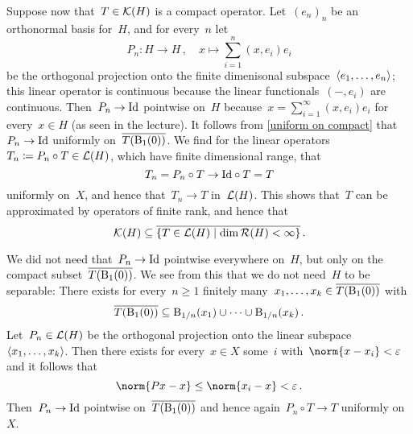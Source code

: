 Suppose now that~$T \in \mathcal{K}(H)$ is a compact operator.
Let~$(e_n)_n$ be an orthonormal basis for~$H$, and for every~$n$ let
\[
  P_n
  \colon
  H
  \to
  H \,,
  \quad
  x
  \mapsto
  \sum_{i=1}^n (x,e_i) e_i
\]
be the orthogonal projection onto the finite dimenisonal subspace~$\langle e_1, \dotsc, e_n\rangle$;
this linear operator is continuous because the linear functionals~$(-,e_i)$ are continuous.
Then~$P_n \to \operatorname{Id}$ pointwise on~$H$ because~$x = \sum_{i=1}^\infty (x, e_i) e_i$ for every~$x \in H$ (as seen in the lecture).
It follows from \cref{uniform on compact} that~$P_n \to \operatorname{Id}$ uniformly on~$\overline{T(\operatorname{B}_{1}(0))}$.
We find for the linear operators~$T_n \coloneqq P_n \circ T \in \mathcal{L}(H)$, which have finite dimensional range, that
\[
  T_n
  =
  P_n \circ T
  \to
  {\operatorname{Id}} \circ T
  = T
\]
uniformly on~$X$, and hence that~$T_n \to T$ in~$\mathcal{L}(H)$.
This shows that~$T$ can be approximated by operators of finite rank, and hence that
\[
  \Compact(H)
  \subseteq
  \closure{
  \{
    T \in \Lin(H)
  \suchthat
    \dim \Range(H) < \infty
  \}
  } \,.
\]


\begin{remark}
  We did not need that~$P_n \to \operatorname{Id}$ pointwise everywhere on~$H$, but only on the compact subset~$\overline{T(\operatorname{B}_{1}(0))}$.
  We see from this that we do not need~$H$ to be separable:
  There exists for every~$n \geq 1$ finitely many~$x_1, \dotsc, x_k \in \overline{T(\operatorname{B}_{1}(0))}$ with
  \[
    \overline{T(\operatorname{B}_{1}(0))}
    \subseteq
    \operatorname{B}_{1/n}(x_1) \cup \dotsb \cup \operatorname{B}_{1/n}(x_k) \,.
  \]
  Let~$P_n \in \mathcal{L}(H)$ be the orthogonal projection onto the  linear subspace~$\langle x_1, \dotsc, x_k\rangle$.
  Then there exists for every~$x \in X$ some~$i$ with~$\norm{x - x_i} < \varepsilon$ and it follows that
  \[
    \norm{P x - x}
    \leq
    \norm{x_i - x}
    <
    \varepsilon \,.
  \]
  Then~$P_n \to \operatorname{Id}$ pointwise on~$\overline{T(\operatorname{B}_{1}(0))}$ and hence again~$P_n \circ T \to T$ uniformly on~$X$.
\end{remark}



